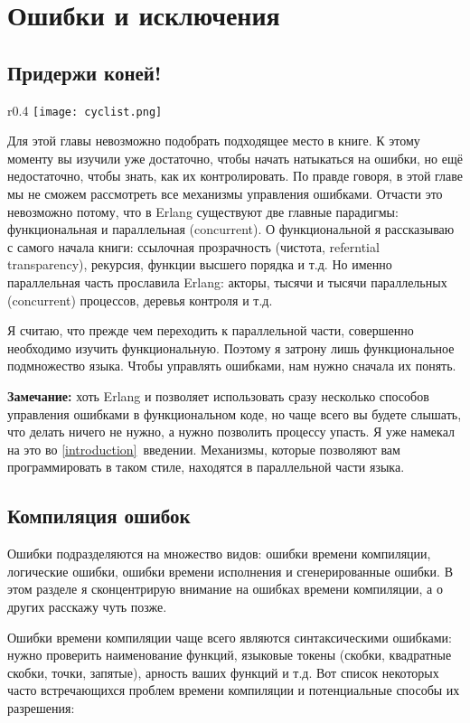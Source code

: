 \chapter{Ошибки и исключения}
\label{errors-and-exceptions}
\section{Придержи коней!}
\begin{wrapfigure}{r}{0.4\linewidth}
    \texttt{[image: cyclist.png]}
\end{wrapfigure}
Для этой главы невозможно подобрать подходящее место в книге.
К этому моменту вы изучили уже достаточно, чтобы начать натыкаться на ошибки, но ещё недостаточно, чтобы знать, как их контролировать.
По правде говоря, в этой главе мы не сможем рассмотреть все механизмы управления ошибками.
Отчасти это невозможно потому, что в Erlang существуют две главные парадигмы: функциональная и параллельная (concurrent).
О функциональной я рассказываю с самого начала книги: ссылочная прозрачность (чистота, referntial transparency), рекурсия, функции высшего порядка и т.д.
Но именно параллельная часть прославила Erlang: акторы, тысячи и тысячи параллельных (concurrent) процессов, деревья контроля и т.д.

Я считаю, что прежде чем переходить к параллельной части, совершенно необходимо изучить функциональную.
Поэтому я затрону лишь функциональное подмножество языка.
Чтобы управлять ошибками, нам нужно сначала их понять.\\
\colorbox{lgray}
{
\begin{minipage}{1.0\linewidth}
    \textbf{Замечание:} хоть Erlang и позволяет использовать сразу несколько способов управления ошибками в функциональном коде, но чаще всего вы будете слышать, что делать ничего не нужно, а нужно позволить процессу упасть.
    Я уже намекал на это во \ref{introduction}~введении.
    Механизмы, которые позволяют вам программировать в таком стиле, находятся в параллельной части языка.
\end{minipage}
}
\section{Компиляция ошибок}
Ошибки подразделяются на множество видов: ошибки времени компиляции, логические ошибки, ошибки времени исполнения и сгенерированные ошибки.
В этом разделе я сконцентрирую внимание на ошибках времени компиляции, а о других расскажу чуть позже.

Ошибки времени компиляции чаще всего являются синтаксическими ошибками: нужно проверить наименование функций, языковые токены (скобки, квадратные скобки, точки, запятые), арность ваших функций и т.д.
Вот список некоторых часто встречающихся проблем времени компиляции и потенциальные способы их разрешения:

